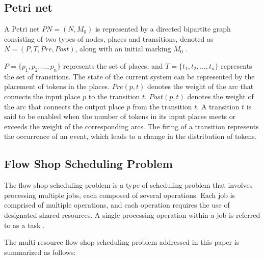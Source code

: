 \documentclass[conference]{IEEEtran}
\begin{document}
\subsection{Petri net}
A Petri net $PN = (N,M_0)$ is represented by a directed bipartite graph consisting of two types of nodes, places and transitions, denoted as $N = (P,T,Pre,Post)$, along with an initial marking $M_0$ \cite{b1}.

$P = \{p_1, p_2, \ldots, p_n\}$ represents the set of places, and $T = \{t_1, t_2, \ldots, t_n\}$ represents the set of transitions. The state of the current system can be represented by the placement of tokens in the places. $Pre(p,t)$ denotes the weight of the arc that connects the input place $p$ to the transition $t$. $Post(p,t)$ denotes the weight of the arc that connects the output place $p$ from the transition $t$. A transition $t$ is said to be enabled when the number of tokens in its input places meets or exceeds the weight of the corresponding arcs. The firing of a transition represents the occurrence of an event, which leads to a change in the distribution of tokens.


\subsection{Flow Shop Scheduling Problem} 
The flow shop scheduling problem is a type of scheduling problem that involves processing multiple jobs, each composed of several operations. 
Each job is comprised of multiple operations, and each operation requires the use of designated shared resources. A single processing operation within a job is referred to as a task \cite{b2}.

The multi-resource flow shop scheduling problem addressed in this paper is summarized as follows:
\end{document}
